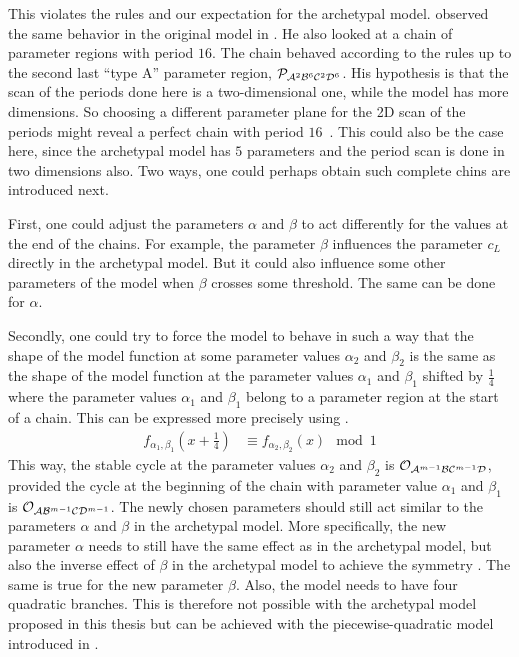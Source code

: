 This violates the rules and our expectation for the archetypal model.
 observed the same behavior in the original model in \cite{akyuz2022}.
He also looked at a chain of parameter regions with period $16$.
The chain behaved according to the rules up to the second last ``type A'' parameter region, $\mathcal{P}_{\mathcal{A}^2\mathcal{B}^6\mathcal{C}^2\mathcal{D}^6}$.
His hypothesis is that the scan of the periods done here is a two-dimensional one, while the model has more dimensions.
So choosing a different parameter plane for the 2D scan of the periods might reveal a perfect chain with period $16$~\cite{akyuz2022}.
This could also be the case here, since the archetypal model has $5$ parameters and the period scan is done in two dimensions also.
Two ways, one could perhaps obtain such complete chins are introduced next.

First, one could adjust the parameters $\alpha$ and $\beta$ to act differently for the values at the end of the chains.
For example, the parameter $\beta$ influences the parameter $c_L$ directly in the archetypal model.
But it could also influence some other parameters of the model when $\beta$ crosses some threshold.
The same can be done for $\alpha$.

Secondly, one could try to force the model to behave in such a way that the shape of the model function at some parameter values $\alpha_2$ and $\beta_2$ is the same as the shape of the model function at the parameter values $\alpha_1$ and $\beta_1$ shifted by $\frac{1}{4}$ where the parameter values $\alpha_1$ and $\beta_1$ belong to a parameter region at the start of a chain.
This can be expressed more precisely using .
\begin{align}
	f_{\alpha_1, \beta_1}\left(x + \frac{1}{4}\right) & \equiv f_{\alpha_2, \beta_2}(x) \mod 1
	\label{equ:arch.dyn.shift}
\end{align}
This way, the stable cycle at the parameter values $\alpha_2$ and $\beta_2$ is $\mathcal{O}_{\mathcal{A}^{m-1}\mathcal{B}\mathcal{C}^{m-1}\mathcal{D}}$, provided the cycle at the beginning of the chain with parameter value $\alpha_1$ and $\beta_1$ is $\mathcal{O}_{\mathcal{A}\mathcal{B}^{m-1}\mathcal{C}\mathcal{D}^{m-1}}$.
The newly chosen parameters should still act similar to the parameters $\alpha$ and $\beta$ in the archetypal model.
More specifically, the new parameter $\alpha$ needs to still have the same effect as in the archetypal model, but also the inverse effect of $\beta$ in the archetypal model to achieve the symmetry .
The same is true for the new parameter $\beta$.
Also, the model needs to have four quadratic branches.
This is therefore not possible with the archetypal model proposed in this thesis but can be achieved with the piecewise-quadratic model introduced in .
